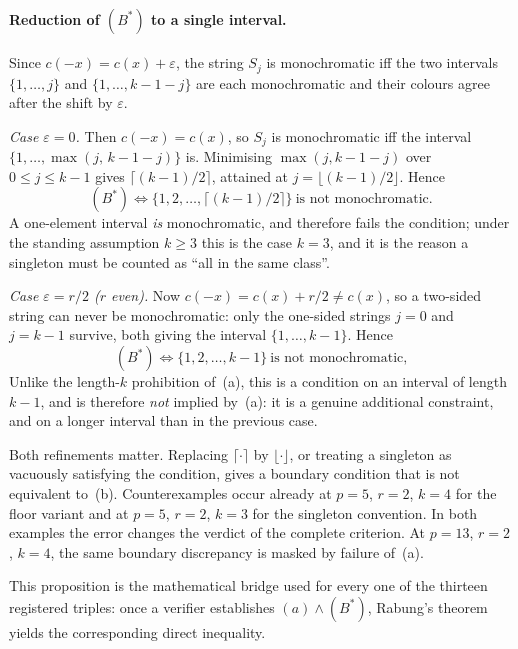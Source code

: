 \paragraph{Reduction of $(B^{*})$ to a single interval.}
Since $c(-x)=c(x)+\varepsilon$, the string $S_j$ is monochromatic iff the two
intervals $\{1,\dots,j\}$ and $\{1,\dots,k-1-j\}$ are each monochromatic and their
colours agree after the shift by $\varepsilon$.

\emph{Case $\varepsilon=0$.} Then $c(-x)=c(x)$, so $S_j$ is monochromatic iff the
interval $\{1,\dots,\max(j,\,k-1-j)\}$ is. Minimising $\max(j,k-1-j)$ over
$0\le j\le k-1$ gives $\lceil(k-1)/2\rceil$, attained at $j=\lfloor(k-1)/2\rfloor$.
Hence
\[
  (B^{*})\iff \{1,2,\dots,\lceil (k-1)/2\rceil\}\ \text{is not monochromatic.}
\]
A one-element interval \emph{is} monochromatic, and therefore fails the condition;
under the standing assumption $k\ge3$ this is the case $k=3$, and it is the reason
a singleton must be counted as ``all in the same class''.

\emph{Case $\varepsilon=r/2$ ($r$ even).} Now $c(-x)=c(x)+r/2\ne c(x)$, so a
two-sided string can never be monochromatic: only the one-sided strings $j=0$ and
$j=k-1$ survive, both giving the interval $\{1,\dots,k-1\}$. Hence
\[
  (B^{*})\iff \{1,2,\dots,k-1\}\ \text{is not monochromatic,}
\]
Unlike the length-$k$ prohibition of~(a), this is a condition on an interval of
length $k-1$, and is therefore \emph{not} implied by~(a): it is a genuine
additional constraint, and on a longer interval than in the previous case.

\begin{remark}
Both refinements matter. Replacing $\lceil\cdot\rceil$ by $\lfloor\cdot\rfloor$, or
treating a singleton as vacuously satisfying the condition, gives a boundary
condition that is not equivalent to~(b).  Counterexamples occur already at
$p=5$, $r=2$, $k=4$ for the floor variant and at $p=5$, $r=2$, $k=3$ for the
singleton convention. In both examples the error changes the verdict of the
complete criterion. At $p=13$, $r=2$, $k=4$, the same boundary discrepancy
is masked by failure of~(a).
\end{remark}

This proposition is the mathematical bridge used for every one of the thirteen
registered triples: once a verifier establishes $(a)\wedge(B^{*})$, Rabung's
theorem yields the corresponding direct inequality.

